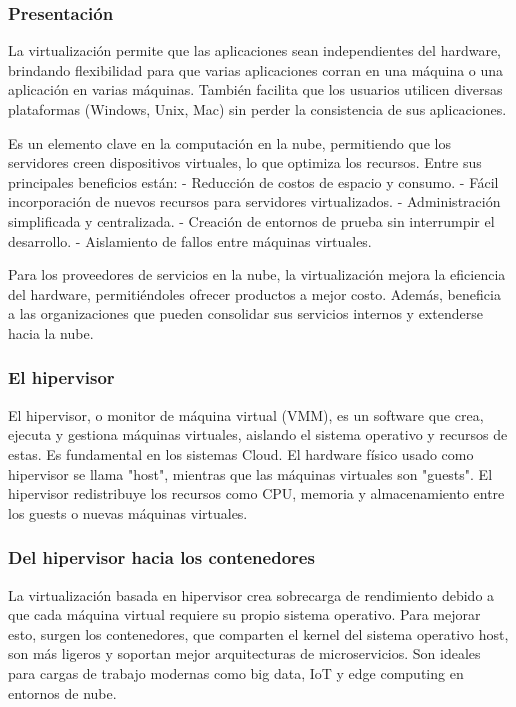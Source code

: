 \documentclass{article}
\begin{document}
\subsubsection{Presentación}

La virtualización permite que las aplicaciones sean independientes del hardware, brindando flexibilidad para que varias aplicaciones corran en una máquina o una aplicación en varias máquinas. También facilita que los usuarios utilicen diversas plataformas (Windows, Unix, Mac) sin perder la consistencia de sus aplicaciones.

Es un elemento clave en la computación en la nube, permitiendo que los servidores creen dispositivos virtuales, lo que optimiza los recursos. Entre sus principales beneficios están:
- Reducción de costos de espacio y consumo.
- Fácil incorporación de nuevos recursos para servidores virtualizados.
- Administración simplificada y centralizada.
- Creación de entornos de prueba sin interrumpir el desarrollo.
- Aislamiento de fallos entre máquinas virtuales.

Para los proveedores de servicios en la nube, la virtualización mejora la eficiencia del hardware, permitiéndoles ofrecer productos a mejor costo. Además, beneficia a las organizaciones que pueden consolidar sus servicios internos y extenderse hacia la nube. 

\subsubsection{El hipervisor}

El hipervisor, o monitor de máquina virtual (VMM), es un software que crea, ejecuta y gestiona máquinas virtuales, aislando el sistema operativo y recursos de estas. Es fundamental en los sistemas Cloud. El hardware físico usado como hipervisor se llama "host", mientras que las máquinas virtuales son "guests". El hipervisor redistribuye los recursos como CPU, memoria y almacenamiento entre los guests o nuevas máquinas virtuales.

\subsubsection{Del hipervisor hacia los contenedores}

La virtualización basada en hipervisor crea sobrecarga de rendimiento debido a que cada máquina virtual requiere su propio sistema operativo. Para mejorar esto, surgen los contenedores, que comparten el kernel del sistema operativo host, son más ligeros y soportan mejor arquitecturas de microservicios. Son ideales para cargas de trabajo modernas como big data, IoT y edge computing en entornos de nube.
\end{document}

